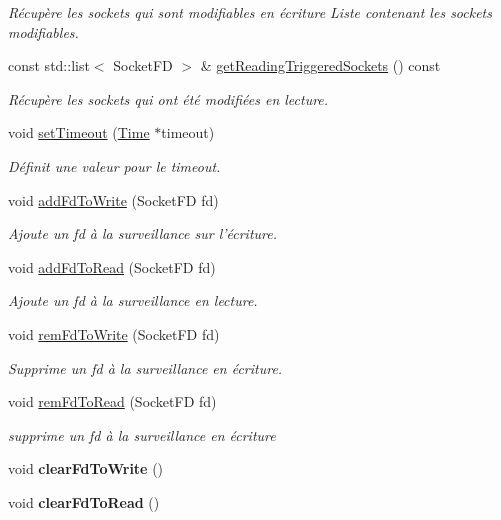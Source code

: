 \begin{DoxyCompactItemize}
\begin{DoxyCompactList}\small\item\em Récupère les sockets qui sont modifiables en écriture  Liste contenant les sockets modifiables. \end{DoxyCompactList}\item 
const std\-::list$<$ Socket\-F\-D $>$ \& \hyperlink{classmognetwork_1_1_selector_ae41a4ff4e9281cdd03880f69c0c71a35}{get\-Reading\-Triggered\-Sockets} () const 
\begin{DoxyCompactList}\small\item\em Récupère les sockets qui ont été modifiées en lecture. \end{DoxyCompactList}\item 
void \hyperlink{classmognetwork_1_1_selector_ac03b53749206d8ba80dec22bad55e0a8}{set\-Timeout} (\hyperlink{_selector_8hh_af47ac292ef7224cf549b944d138ba4ae}{Time} $\ast$timeout)
\begin{DoxyCompactList}\small\item\em Définit une valeur pour le timeout. \end{DoxyCompactList}\item 
void \hyperlink{classmognetwork_1_1_selector_a6f22d28dc38b5d252c0590de857d67f7}{add\-Fd\-To\-Write} (Socket\-F\-D fd)
\begin{DoxyCompactList}\small\item\em Ajoute un fd à la surveillance sur l'écriture. \end{DoxyCompactList}\item 
void \hyperlink{classmognetwork_1_1_selector_aacc48e5256e3b5150f80acad84b82de3}{add\-Fd\-To\-Read} (Socket\-F\-D fd)
\begin{DoxyCompactList}\small\item\em Ajoute un fd à la surveillance en lecture. \end{DoxyCompactList}\item 
void \hyperlink{classmognetwork_1_1_selector_ad03d2d3e016838b38fb865a7924915e5}{rem\-Fd\-To\-Write} (Socket\-F\-D fd)
\begin{DoxyCompactList}\small\item\em Supprime un fd à la surveillance en écriture. \end{DoxyCompactList}\item 
void \hyperlink{classmognetwork_1_1_selector_a1ae5d9e72ca6950f82d76e439ce9f74d}{rem\-Fd\-To\-Read} (Socket\-F\-D fd)
\begin{DoxyCompactList}\small\item\em supprime un fd à la surveillance en écriture \end{DoxyCompactList}\item 
\hypertarget{classmognetwork_1_1_selector_a20320a6ffd2d9c920093f192e1cf444a}{void {\bfseries clear\-Fd\-To\-Write} ()}\label{classmognetwork_1_1_selector_a20320a6ffd2d9c920093f192e1cf444a}

\item 
\hypertarget{classmognetwork_1_1_selector_a88e19f9d3cd6c52ff2461fdd92371940}{void {\bfseries clear\-Fd\-To\-Read} ()}\label{classmognetwork_1_1_selector_a88e19f9d3cd6c52ff2461fdd92371940}

\end{DoxyCompactItemize}


